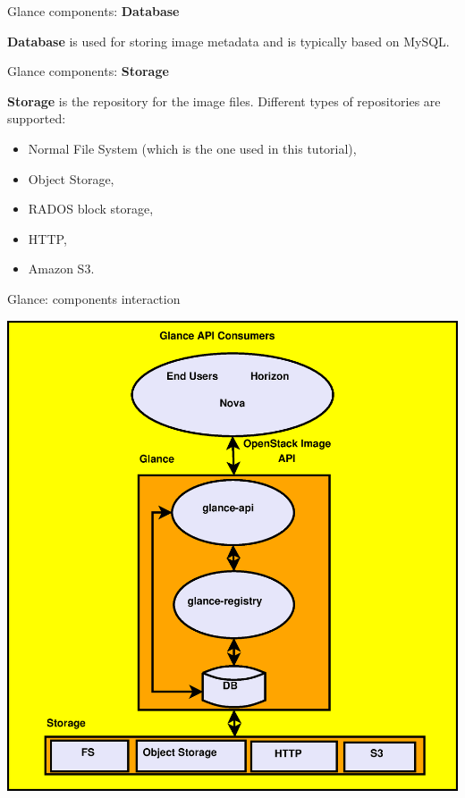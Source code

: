 \documentclass[english,serif,mathserif]{beamer}
\begin{document}
\begin{frame}{Glance components: \textbf{Database}}

\textbf{Database} is used for storing image metadata and is typically based on MySQL.

\end{frame}

\begin{frame}{Glance components: \textbf{Storage}}

\textbf{Storage} is the repository for the image files. Different types of 
repositories are supported:

\begin{itemize}
\item Normal File System (which is the one used in this tutorial),
\item Object Storage,
\item RADOS block storage,
\item HTTP,
\item Amazon S3.
\end{itemize} 

\end{frame}

\begin{frame}{Glance: components interaction}

\centerline{\includegraphics[scale=0.30]{glance.eps}}

\end{frame}
\end{document}
